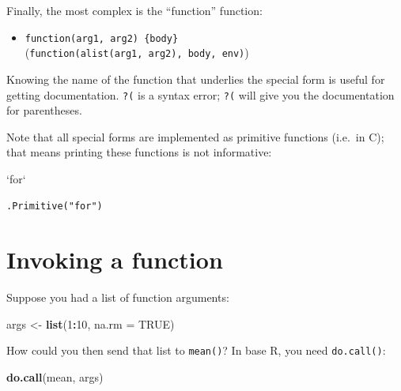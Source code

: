\documentclass[]{book}
\newenvironment{Shaded}{\begin{snugshade}}{\end{snugshade}}
\newcommand{\DataTypeTok}[1]{\textcolor[rgb]{0.13,0.29,0.53}{#1}}
\newcommand{\DecValTok}[1]{\textcolor[rgb]{0.00,0.00,0.81}{#1}}
\newcommand{\KeywordTok}[1]{\textcolor[rgb]{0.13,0.29,0.53}{\textbf{#1}}}
\newcommand{\NormalTok}[1]{#1}
\newcommand{\OperatorTok}[1]{\textcolor[rgb]{0.81,0.36,0.00}{\textbf{#1}}}
\newcommand{\OtherTok}[1]{\textcolor[rgb]{0.56,0.35,0.01}{#1}}
\newcommand{\StringTok}[1]{\textcolor[rgb]{0.31,0.60,0.02}{#1}}
\providecommand{\tightlist}{%
  \setlength{\itemsep}{0pt}\setlength{\parskip}{0pt}}
\theoremstyle{definition}
\theoremstyle{definition}
\theoremstyle{definition}
\theoremstyle{remark}
\begin{document}
Finally, the most complex is the ``function'' function:

\begin{itemize}
\tightlist
\item
  \texttt{function(arg1,\ arg2)\ \{body\}}
  (\texttt{\textasciigrave{}function\textasciigrave{}(alist(arg1,\ arg2),\ body,\ env)})
\end{itemize}

Knowing the name of the function that underlies the special form is
useful for getting documentation. \texttt{?(} is a syntax error;
\texttt{?\textasciigrave{}(\textasciigrave{}} will give you the
documentation for parentheses.

Note that all special forms are implemented as primitive functions
(i.e.~in C); that means printing these functions is not informative:

\begin{Shaded}
\begin{Highlighting}[]
\StringTok{`}\DataTypeTok{for}\StringTok{`}
\end{Highlighting}
\end{Shaded}

\begin{verbatim}
.Primitive("for")
\end{verbatim}

\hypertarget{invoking-a-function}{%
\section{Invoking a function}\label{invoking-a-function}}

Suppose you had a list of function arguments:

\begin{Shaded}
\begin{Highlighting}[]
\NormalTok{args <-}\StringTok{ }\KeywordTok{list}\NormalTok{(}\DecValTok{1}\OperatorTok{:}\DecValTok{10}\NormalTok{, }\DataTypeTok{na.rm =} \OtherTok{TRUE}\NormalTok{)}
\end{Highlighting}
\end{Shaded}

How could you then send that list to \texttt{mean()}? In base R, you
need \texttt{do.call()}:

\begin{Shaded}
\begin{Highlighting}[]
\KeywordTok{do.call}\NormalTok{(mean, args)}
\end{Highlighting}
\end{Shaded}
\end{document}
